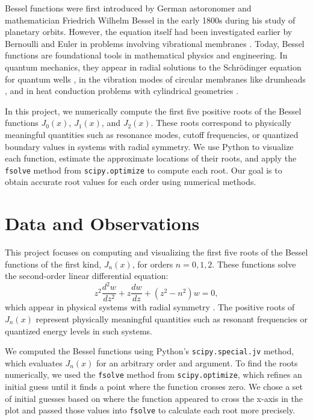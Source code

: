 \documentclass[linenumbers, twocolumn]{aastex631}
\begin{document}
\noindent Bessel functions were first introduced by German astoronomer and
mathematician Friedrich Wilhelm Bessel in the early 1800s during his study of
planetary orbits. However, the equation itself had been investigated earlier
by Bernoulli and Euler in problems involving vibrational membranes
\citet{abramowitz_stegun}. Today, Bessel functions are foundational tools in 
mathematical physics and engineering. In quantum mechanics, they appear in 
radial solutions to the Schrödinger equation for quantum wells \cite{hanson}, in the 
vibration modes of circular membranes like drumheads \cite{tamrin}, and in heat 
conduction problems with cylindrical geometries \cite{neils}.

\noindent In this project, we numerically compute the first five positive roots
of the Bessel functions $J_0(x)$, $J_1(x)$, and $J_2(x)$. These roots correspond
to physically meaningful quantities such as resonance modes, cutoff frequencies, 
or quantized boundary values in systems with radial symmetry. We use Python to visualize each
function, estimate the approximate locations of their roots, and apply the \texttt{fsolve}
method from \texttt{scipy.optimize} to compute each root. 
Our goal is to obtain accurate root values for each order
using numerical methods.\\


\section{Data and Observations} \label{sec:data}

This project focuses on computing and visualizing the first five roots of the
Bessel functions of the first kind, $J_n(x)$, for orders $n=0,1,2$. These
functions solve the second-order linear differential equation:
\begin{equation}
    z^2\frac{d^2 w}{dz^2}+z\frac{dw}{dz}+(z^2-n^2)w=0,
\end{equation}
\noindent which appear in physical systems with radial 
symmetry \citet{abramowitz_stegun}. The positive roots of $J_n(x)$ represent physically meaningful
quantities such as resonant frequencies or quantized energy levels in such
systems.

\noindent We computed the Bessel functions using Python's \texttt{scipy.special.jv}
method, which evaluates $J_n(x)$ for an arbitrary order and argument. To
find the roots numerically, we used the \texttt{fsolve} method from \texttt{scipy.optimize},
which refines an initial guess until it finds a point where the function crosses
zero. We chose a set of initial guesses based on where the function appeared to
cross the x-axis in the plot and passed those values into \texttt{fsolve} to
calculate each root more precisely. 
\end{document}
